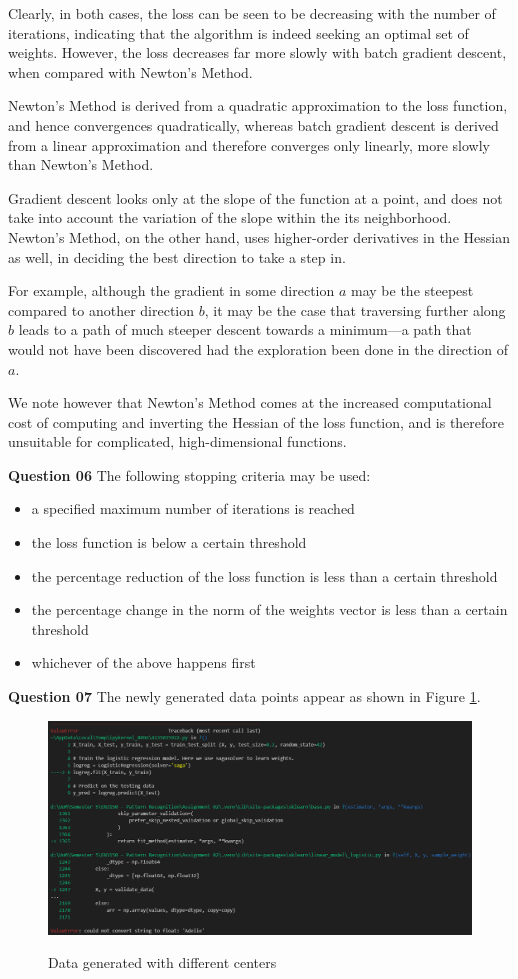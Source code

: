 \documentclass{article}[a4paper]
\begin{document}
	Clearly, in both cases, the loss can be seen to be decreasing with the number of iterations, indicating that the algorithm is indeed seeking an optimal set of weights. However, the loss decreases far more slowly with batch gradient descent, when compared with Newton's Method.

	Newton's Method is derived from a quadratic approximation to the loss function, and hence convergences quadratically, whereas batch gradient descent is derived from a linear approximation and therefore converges only linearly, more slowly than Newton's Method.

	Gradient descent looks only at the slope of the function at a point, and does not take into account the variation of the slope within the its neighborhood. Newton's Method, on the other hand, uses higher-order derivatives in the Hessian as well, in deciding the best direction to take a step in.

	For example, although the gradient in some direction $a$ may be the steepest compared to another direction $b$, it may be the case that traversing further along $b$ leads to a path of much steeper descent towards a minimum---a path that would not have been discovered had the exploration been done in the direction of $a$.

	We note however that Newton's Method comes at the increased computational cost of computing and inverting the Hessian of the loss function, and is therefore unsuitable for complicated, high-dimensional functions.
	\medskip

	\textbf{Question 06} The following stopping criteria may be used:
	\begin{itemize}[noitemsep]
		\item a specified maximum number of iterations is reached
		\item the loss function is below a certain threshold
		\item the percentage reduction of the loss function is less than a certain threshold
		\item the percentage change in the norm of the weights vector is less than a certain threshold
		\item whichever of the above happens first
	\end{itemize}
	\medskip

	\textbf{Question 07} The newly generated data points appear as shown in Figure \ref{q3_7_1}.

	\begin{figure}[H]
		\centering
		\includegraphics[width=0.8\linewidth]{images/error.png}
		\label{q3_7_1}
		\caption{Data generated with different centers}
	\end{figure}
\end{document}
